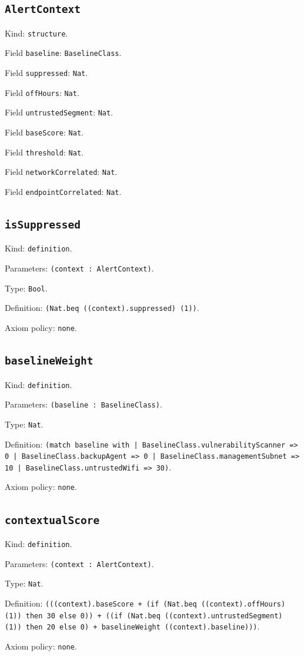 \documentclass[11pt]{article}
\begin{document}
\subsection*{\texttt{AlertContext}}
\noindent Kind: \texttt{structure}.\par
\noindent Field \texttt{baseline}: \texttt{BaselineClass}.\par
\noindent Field \texttt{suppressed}: \texttt{Nat}.\par
\noindent Field \texttt{offHours}: \texttt{Nat}.\par
\noindent Field \texttt{untrustedSegment}: \texttt{Nat}.\par
\noindent Field \texttt{baseScore}: \texttt{Nat}.\par
\noindent Field \texttt{threshold}: \texttt{Nat}.\par
\noindent Field \texttt{networkCorrelated}: \texttt{Nat}.\par
\noindent Field \texttt{endpointCorrelated}: \texttt{Nat}.\par
\subsection*{\texttt{isSuppressed}}
\noindent Kind: \texttt{definition}.\par
\noindent Parameters: \texttt{(context : AlertContext)}.\par
\noindent Type: \texttt{Bool}.\par
\noindent Definition: \texttt{(Nat.beq ((context).suppressed) (1))}.\par
\noindent Axiom policy: \texttt{none}.\par
\subsection*{\texttt{baselineWeight}}
\noindent Kind: \texttt{definition}.\par
\noindent Parameters: \texttt{(baseline : BaselineClass)}.\par
\noindent Type: \texttt{Nat}.\par
\noindent Definition: \texttt{(match baseline with | BaselineClass.vulnerabilityScanner => 0 | BaselineClass.backupAgent => 0 | BaselineClass.managementSubnet => 10 | BaselineClass.untrustedWifi => 30)}.\par
\noindent Axiom policy: \texttt{none}.\par
\subsection*{\texttt{contextualScore}}
\noindent Kind: \texttt{definition}.\par
\noindent Parameters: \texttt{(context : AlertContext)}.\par
\noindent Type: \texttt{Nat}.\par
\noindent Definition: \texttt{(((context).baseScore + (if (Nat.beq ((context).offHours) (1)) then 30 else 0)) + ((if (Nat.beq ((context).untrustedSegment) (1)) then 20 else 0) + baselineWeight ((context).baseline)))}.\par
\noindent Axiom policy: \texttt{none}.\par
\end{document}
